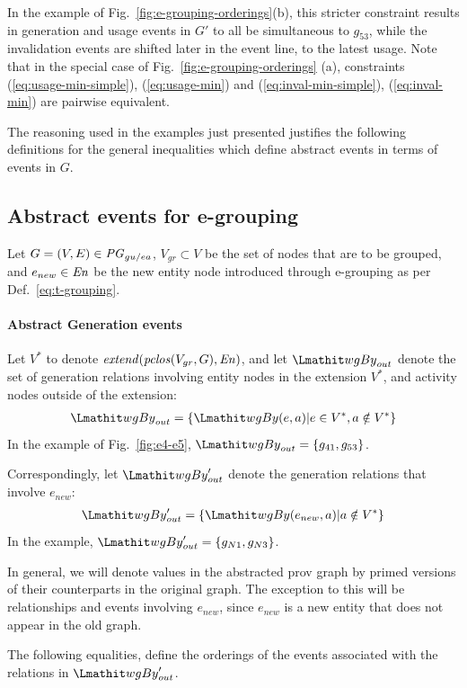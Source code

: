 In the example of Fig.~\ref{fig:e-grouping-orderings}(b), this stricter constraint results in  generation and usage events in $G'$ to all be simultaneous to $g_{53}$, while the invalidation events are shifted later in the event line, to the latest usage. Note that in the special case of Fig.~\ref{fig:e-grouping-orderings} (a), constraints (\ref{eq:usage-min-simple}), (\ref{eq:usage-min}) and (\ref{eq:inval-min-simple}), (\ref{eq:inval-min})  are pairwise equivalent.

The reasoning used in the examples just presented justifies the following definitions for the general inequalities which define abstract events in terms of events in $G$.

\subsection{Abstract events for e-grouping}
\label{sec:abstract-events-for-e-grouping}
%
Let $G=(V,E) \in \mathit{PG}_{gu/ea}$, $V_{gr} \subset V$ be the set of nodes that are to be grouped, and  $e_{new} \in \mathit{En}$ be the new entity node introduced through e-grouping as per Def.~\ref{eq:t-grouping}.
% 

\paragraph*{\textbf{Abstract Generation events}}
Let $V^*$ to denote $\mathit{extend}(\mathit{pclos}(V_{gr},G), \mathit{En})$, and let $\wgby_{out}$ denote the set of generation relations involving entity nodes in the extension
$V^*$, and activity nodes outside of the extension:
\begin{align*} 
\wgby_{out} = \{ \wgby(e,a) |  e \in V^*,  a \notin V^* \}
\end{align*} 
In the example of Fig.~\ref{fig:e4-e5}, $\wgby_{out} = \{ g_{41}, g_{53} \}$.

%
Correspondingly, let $\wgby'_{out}$ denote the generation relations that involve $e_{new}$:
\begin{align*} 
\wgby'_{out} = \{ \wgby(e_{new},a) | a \notin V^* \}
\end{align*} 
In the example, $\wgby'_{out} = \{ g_{N1}, g_{N3} \}$.

In general, we will denote values in the abstracted prov graph by primed versions of their counterparts in the original graph. The exception to this will be relationships and events involving $e_{new}$, since $e_{new}$ is  a new entity that does not appear in the old graph.

The following equalities, define the orderings of the events associated with the relations in $\wgby'_{out}$.



